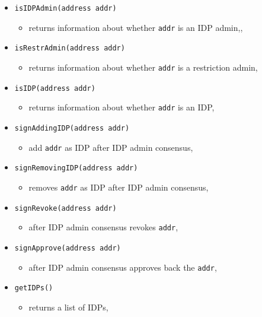 \documentclass[12pt]{article}
\begin{document}
\begin{itemize}
\begin{itemize}
        \end{itemize}
    \item \texttt{isIDPAdmin(address addr)}
        \begin{itemize}
            \item[] returns information about whether \texttt{addr} is an IDP admin,,
        \end{itemize}
    \item \texttt{isRestrAdmin(address addr)}
        \begin{itemize}
            \item[] returns information about whether \texttt{addr} is a restriction admin,
        \end{itemize}
    \item \texttt{isIDP(address addr)}
        \begin{itemize}
            \item[] returns information about whether \texttt{addr} is an IDP,
        \end{itemize}
    \item \texttt{signAddingIDP(address addr)}
        \begin{itemize}
            \item[] add \texttt{addr} as IDP after IDP admin consensus,
        \end{itemize}
    \item \texttt{signRemovingIDP(address addr)}
        \begin{itemize}
            \item[] removes \texttt{addr} as IDP after IDP admin consensus,
        \end{itemize}
    \item \texttt{signRevoke(address addr)}
        \begin{itemize}
            \item[] after IDP admin consensus revokes \texttt{addr},
        \end{itemize}
    \item \texttt{signApprove(address addr)}
        \begin{itemize}
            \item[] after IDP admin consensus approves back the \texttt{addr},
        \end{itemize}
    \item \texttt{getIDPs()}
        \begin{itemize}
            \item[] returns a list of IDPs,
        \end{itemize}

\end{itemize}
\end{document}
